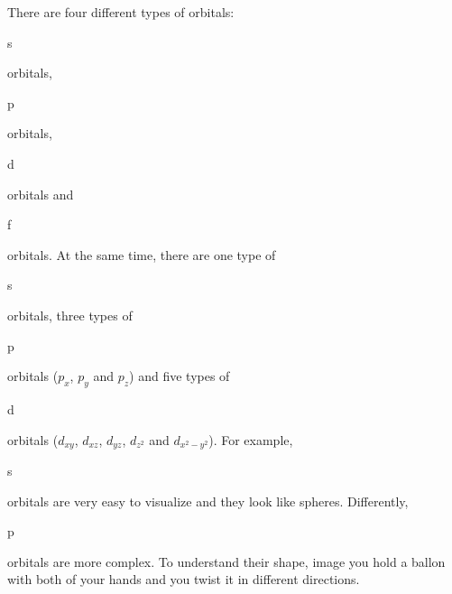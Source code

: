 \documentclass[main.tex]{subfiles}
\begin{document}
\begin{description}
There are four different types of orbitals: \begin{it}s\end{it} orbitals, \begin{it}p\end{it} orbitals, \begin{it}d\end{it} orbitals and \begin{it}f\end{it} orbitals. At the same time, there are one type of \begin{it}s\end{it} orbitals, three types of \begin{it}p\end{it} orbitals ($p_x$, $p_y$ and $p_z$) and five types of \begin{it}d\end{it} orbitals ($d_{xy}$, $d_{xz}$, $d_{yz}$, $d_{z^2}$ and $d_{x^2-y^2}$). For example, \begin{it}s\end{it} orbitals are very easy to visualize and they look like spheres. Differently, \begin{it}p\end{it} orbitals are more complex. To understand their shape, image you hold a ballon with both of your hands and you twist it in different directions.
 
\begin{figure}%
 
  \centering

  
\end{figure}
\end{description}
\end{document}
